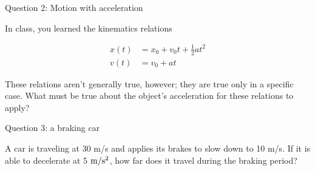 \documentclass[12pt]{article}
\begin{document}
\vspace{3in}
\newpage
\centerline{\Large Question 2: Motion with acceleration}

In class, you learned the kinematics relations

\begin{align*}
x(t) &= x_0 + v_0t + \frac{1}{2}at^2 \\
v(t) &= v_0 + at
\end{align*}

These relations aren't generally true, however; they are true only in a specific case. What must be true about the object's acceleration for these relations to apply?

\vspace{1.2in}
\newpage

\centerline{\Large Question 3: a braking car}

A car is traveling at 30 m/s and applies its brakes to slow down to 10 m/s. If it is able to decelerate at 5 $\rm m/\rm s^2$, how far does it travel during the braking period?
\end{document}
